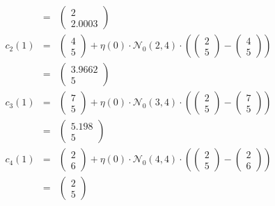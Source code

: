 \documentclass[DIN, pagenumber=false, fontsize=11pt, parskip=half]{scrartcl}
\begin{document}
\begin{enumerate}[label=(\alph*)]
\begin{eqnarray*}
                    &=& \begin{pmatrix} 2 \\ 2.0003 \end{pmatrix} \\
                c_2 (1) &=& \begin{pmatrix} 4 \\ 5 \end{pmatrix} + \eta(0) \cdot \mathcal{N}_0 (2, 4) \cdot \left(\begin{pmatrix} 2 \\ 5\end{pmatrix} - \begin{pmatrix} 4 \\ 5 \end{pmatrix}\right) \\
                    &=& \begin{pmatrix} 3.9662 \\ 5 \end{pmatrix} \\
                c_3 (1) &=& \begin{pmatrix} 7 \\ 5 \end{pmatrix} + \eta(0) \cdot \mathcal{N}_0 (3, 4) \cdot \left(\begin{pmatrix} 2 \\ 5\end{pmatrix} - \begin{pmatrix} 7 \\ 5 \end{pmatrix}\right) \\
                    &=& \begin{pmatrix} 5.198 \\ 5 \end{pmatrix} \\
                c_4 (1) &=& \begin{pmatrix} 2 \\ 6 \end{pmatrix} + \eta(0) \cdot \mathcal{N}_0 (4, 4) \cdot \left(\begin{pmatrix} 2 \\ 5\end{pmatrix} - \begin{pmatrix} 2 \\ 6 \end{pmatrix}\right) \\
                    &=& \begin{pmatrix} 2 \\ 5 \end{pmatrix} \\
            \end{eqnarray*}
    \end{enumerate}
\end{document}
